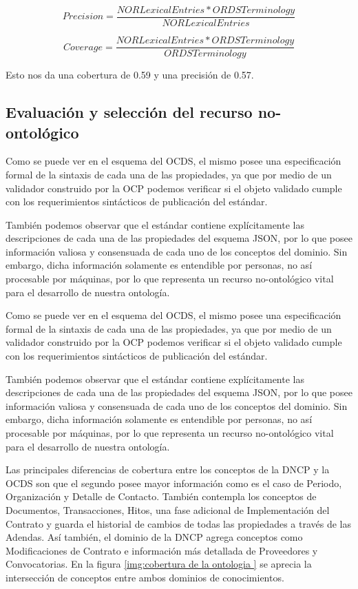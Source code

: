 \begin{equation}
    Precision =  \frac{{NORLexicalEntries}*{ORDSTerminology} }{{NORLexicalEntries}}    
\end{equation}

\begin{equation}
     Coverage = \frac{{NORLexicalEntries}* {ORDSTerminology}}{{ORDSTerminology}}   
\end{equation}

Esto nos da una cobertura de 0.59 y una precisión de 0.57. 

\subsection{Evaluación y selección del recurso no-ontológico}

Como se puede ver en el esquema del OCDS, el mismo posee una especificación formal de la sintaxis de cada una de las propiedades, ya que por medio de un validador construido por la OCP podemos verificar si el objeto validado cumple con los requerimientos sintácticos de publicación del estándar.

También podemos observar que el estándar contiene explícitamente las descripciones de cada una de las propiedades del esquema JSON, por lo que posee información valiosa y consensuada de cada uno de los conceptos del dominio. Sin embargo, dicha información solamente es entendible por personas, no así procesable por máquinas, por lo que representa un recurso no-ontológico vital para el desarrollo de nuestra ontología.

Como se puede ver en el esquema del OCDS, el mismo posee una especificación formal de la sintaxis de cada una de las propiedades, ya que por medio de un validador construido por la OCP podemos verificar si el objeto validado cumple con los requerimientos sintácticos de publicación del estándar.

También podemos observar que el estándar contiene explícitamente las descripciones de cada una de las propiedades del esquema JSON, por lo que posee información valiosa y consensuada de cada uno de los conceptos del dominio. Sin embargo, dicha información solamente es entendible por personas, no así procesable por máquinas, por lo que representa un recurso no-ontológico vital para el desarrollo de nuestra ontología.


Las principales diferencias de cobertura entre los conceptos de la DNCP y la OCDS son que el segundo posee mayor información como es el caso de Periodo, Organización y Detalle de Contacto. También contempla los conceptos de Documentos, Transacciones, Hitos, una fase adicional de Implementación del Contrato y guarda el historial de cambios de todas las propiedades a través de las Adendas. Así también, el dominio de la DNCP agrega conceptos como Modificaciones de Contrato e información más detallada de Proveedores y Convocatorias. En la figura \ref{img:cobertura de la ontologia } se aprecia la intersección de conceptos entre ambos dominios de conocimientos.

